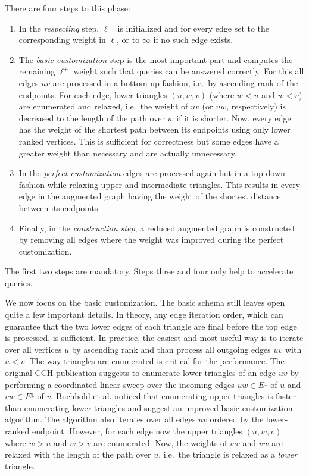 \documentclass[a4paper, english, cleveref]{lipics-v2021}
\newcommand*{\echd}{E^{\downarrow}}
\begin{document}
There are four steps to this phase:
\begin{enumerate}
  \item In the \emph{respecting} step, $\ell^+$ is initialized and for every edge set to the corresponding weight in $\ell$, or to $\infty$ if no such edge exists.
  \item The \emph{basic customization} step is the most important part and computes the remaining $\ell^+$ weight such that queries can be answered correctly.
        For this all edges $uv$ are processed in a bottom-up fashion, i.e.\ by ascending rank of the endpoints.
        For each edge, lower triangles $(u,w,v)$ (where $w < u$ and $w < v$) are enumerated and relaxed, i.e.\ the weight of $uv$ (or $uw$, respectively) is decreased to the length of the path over $w$ if it is shorter.
        Now, every edge has the weight of the shortest path between its endpoints using only lower ranked vertices.
        This is sufficient for correctness but some edges have a greater weight than necessary and are actually unnecessary.
  \item In the \emph{perfect customization} edges are processed again but in a top-down fashion while relaxing upper and intermediate triangles.
        This results in every edge in the augmented graph having the weight of the shortest distance between its endpoints.
  \item Finally, in the \emph{construction step}, a reduced augmented graph is constructed by removing all edges where the weight was improved during the perfect customization.

\end{enumerate}
The first two steps are mandatory.
Steps three and four only help to accelerate queries.

We now focus on the basic customization. %
The basic schema still leaves open quite a few important details.
In theory, any edge iteration order, which can guarantee that the two lower edges of each triangle are final before the top edge is processed, is sufficient.
In practice, the easiest and most useful way is to iterate over all vertices $u$ by ascending rank and than process all outgoing edges $uv$ with $u < v$.
The way triangles are enumerated is critical for the performance.
The original CCH publication suggests to enumerate lower triangles of an edge $uv$ by performing a coordinated linear sweep over the incoming edges $uw \in \echd$ of $u$ and $vw \in \echd$ of $v$.
Buchhold et al. noticed that enumerating upper triangles is faster than enumerating lower triangles and suggest an improved basic customization algorithm.
The algorithm also iterates over all edges $uv$ ordered by the lower-ranked endpoint.
However, for each edge now the upper triangles $(u,w,v)$ where $w>u$ and $w>v$ are enumerated.
Now, the weights of $wv$ and $vw$ are relaxed with the length of the path over $u$, i.e.\ the triangle is relaxed as a \emph{lower} triangle.
\end{document}

